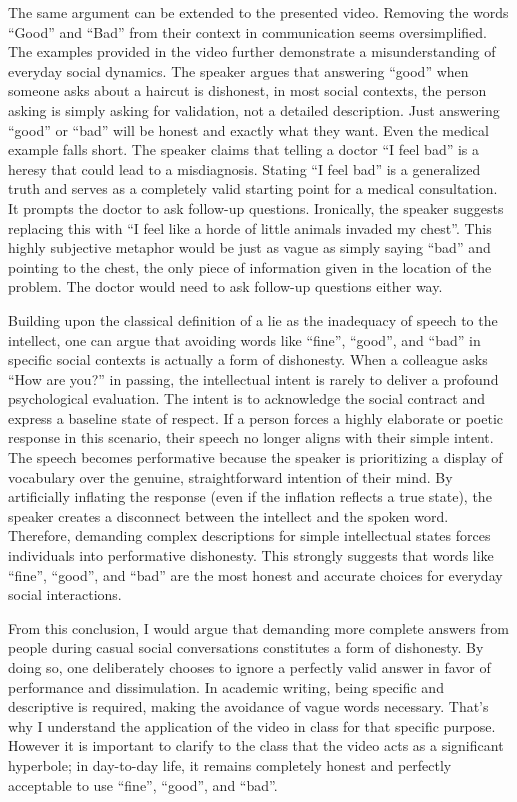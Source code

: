 The same argument can be extended to the presented video. Removing the words ``Good'' and ``Bad'' from their context in communication seems oversimplified. The examples provided in the video further demonstrate a misunderstanding of everyday social dynamics. The speaker argues that answering ``good'' when someone asks about a haircut is dishonest, in most social contexts, the person asking is simply asking for validation, not a detailed description. Just answering ``good'' or ``bad'' will be honest and exactly what they want. Even the medical example falls short. The speaker claims that telling a doctor ``I feel bad'' is a heresy that could lead to a misdiagnosis. Stating ``I feel bad'' is a generalized truth and serves as a completely valid starting point for a medical consultation. It prompts the doctor to ask follow-up questions. Ironically, the speaker suggests replacing this with ``I feel like a horde of little animals invaded my chest''. This highly subjective metaphor would be just as vague as simply saying ``bad'' and pointing to the chest, the only piece of information given in the location of the problem. The doctor would need to ask follow-up questions either way.

Building upon the classical definition of a lie as the inadequacy of speech to the intellect, one can argue that avoiding words like ``fine'', ``good'', and ``bad'' in specific social contexts is actually a form of dishonesty. When a colleague asks ``How are you?'' in passing, the intellectual intent is rarely to deliver a profound psychological evaluation. The intent is to acknowledge the social contract and express a baseline state of respect. If a person forces a highly elaborate or poetic response in this scenario, their speech no longer aligns with their simple intent. The speech becomes performative because the speaker is prioritizing a display of vocabulary over the genuine, straightforward intention of their mind. By artificially inflating the response (even if the inflation reflects a true state), the speaker creates a disconnect between the intellect and the spoken word. Therefore, demanding complex descriptions for simple intellectual states forces individuals into performative dishonesty. This strongly suggests that words like ``fine'', ``good'', and ``bad'' are the most honest and accurate choices for everyday social interactions.

From this conclusion, I would argue that demanding more complete answers from people during casual social conversations constitutes a form of dishonesty. By doing so, one deliberately chooses to ignore a perfectly valid answer in favor of performance and dissimulation. In academic writing, being specific and descriptive is required, making the avoidance of vague words necessary. That's why I understand the application of the video in class for that specific purpose. However it is important to clarify to the class that the video acts as a significant hyperbole; in day-to-day life, it remains completely honest and perfectly acceptable to use ``fine'', ``good'', and ``bad''.

